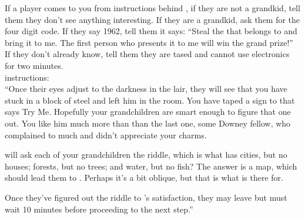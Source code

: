 \documentclass[green]{LRSguildcamp1}
\begin{document}
\name{\gGMHandbook{}}

If a player comes to you from instructions behind \iArtworkThree{}, if they are not a grandkid, tell them they don't see anything interesting.
If they are a grandkid, ask them for the four digit code.  If they say 1962, tell them it says: 
``Steal the \iBagofHolding{} that belongs to \cOS{} and bring it to me. The first person who presents it to me will win the grand prize!''
If they don't already know, tell them they are tased and cannot use electronics for two minutes.
\\
\cChrisHemsworth{\intro} instructions:\\

``Once their eyes adjust to the darkness in the lair, they will see that you have stuck \cChrisHemsworth{\intro} in a block of steel and left him in the room. You have taped a sign to \cChrisHemsworth{} that says Try Me. Hopefully your grandchildren are smart enough to figure that one out. You like him much more than than the last one, some Downey fellow,  who complained to much and didn't appreciate your charms. 

\cChrisHemsworth{} will ask each of your grandchildren the riddle, which is what has cities, but no houses; forests, but no trees; and water, but no fish? The answer is a map, which should lead them to \iArtworkThree{}. Perhaps it's a bit oblique, but that is what \cChrisHemsworth{} is there for. 

Once they've figured out the riddle to \cChrisHemsworth{}'s satisfaction, they may leave but must wait 10 minutes before proceeding to the next step.''
\end{document}
